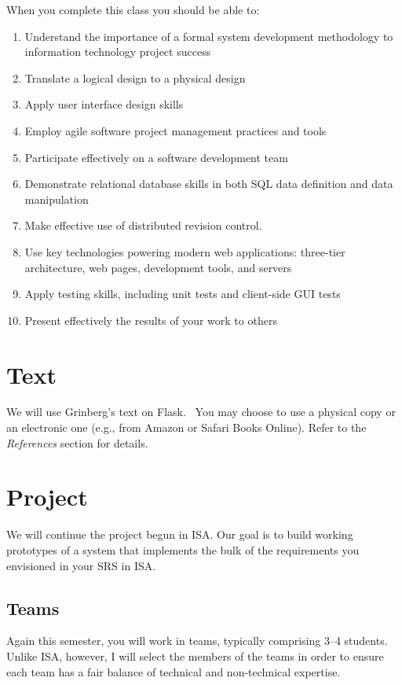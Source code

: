 \documentclass[11pt]{article}
\begin{document}
When you complete this class you should be able to:
\begin{enumerate}
\item Understand the importance
  of a formal system development methodology
  to information technology project success
\item Translate a logical design to a physical design
\item Apply user interface design skills
\item Employ agile software project management practices and tools
\item Participate effectively on a software development team
\item Demonstrate relational database skills
  in both SQL data definition and data manipulation
\item Make effective use of distributed revision control.
\item Use key technologies powering modern web applications:
  three-tier architecture, web pages,
  development tools, and servers
\item Apply testing skills,
  including unit tests and client-side GUI tests
\item Present effectively the results of your work to others
\end{enumerate}

\section{Text}

We will use Grinberg's text on Flask.~\cite{flask}
You may choose to use a physical copy
or an electronic one
(e.g., from Amazon or Safari Books Online).
Refer to the \emph{References}
section for details.

\section{Project}

We will continue the project begun in ISA.
Our goal is to build working prototypes
of a system that implements the bulk of the requirements
you envisioned in your SRS in ISA.

\subsection{Teams}

Again this semester, you will work in teams,
typically comprising 3--4 students.
Unlike ISA, however, I will select the members of the teams
in order to ensure each team has a fair balance
of technical and non-technical expertise.
\end{document}
